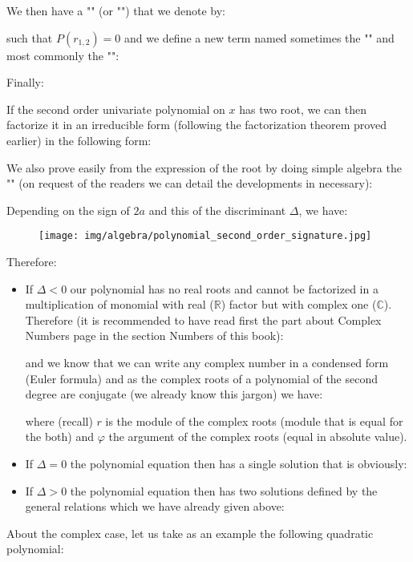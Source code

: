	We then have a "\label{double root}" (or "") that we denote by:
	
	such that $P(r_{1,2})=0$ and we define a new term named sometimes the "" and most commonly the "\label{discriminant}":
		
	Finally\label{second order polynomial roots}:
	
	If the second order univariate polynomial on $x$ has two root, we can then factorize it in an irreducible form (following the factorization theorem proved earlier) in the following form:
	
	We also prove easily from the expression of the root by doing simple algebra the "\label{vieta relations}" (on request of the readers we can detail the developments in necessary):
	
	
	Depending on the sign of $2a$ and this of the discriminant $\Delta$, we have:
	\begin{figure}[H]
		\centering
		\texttt{[image: img/algebra/polynomial\_second\_order\_signature.jpg]}
	\end{figure}
	Therefore:
	\begin{itemize}
		\item If $\Delta<0$ our polynomial has no real roots and cannot be factorized in a multiplication of monomial with real ($
\mathbb{R}$) factor but with complex one ($\mathbb{C}$). Therefore (it is recommended to have read first the part about Complex Numbers page \pageref{complex numbers} in the section Numbers of this book):
		
		and we know that we can write any complex number in a condensed form (Euler formula) and as the complex roots of a polynomial of the second degree are conjugate (we already know this jargon) we have:
		
		where (recall) $r$ is the module of the complex roots (module that is equal for the both) and $\varphi$ the argument of the complex roots (equal in absolute value).
		
		\item If $\Delta=0$ the polynomial equation then has a single solution that is obviously:
		
		
		\item If $\Delta>0$ the polynomial equation then has two solutions defined by the general relations which we have already given above:
		
	\end{itemize}
	About the complex case, let us take as an example the following quadratic polynomial:
	

